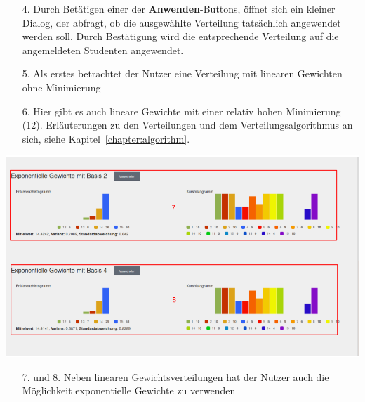   \begin{enumerate}
   \item[4.] Durch Betätigen einer der \textbf{Anwenden}-Buttons, öffnet sich ein kleiner Dialog, der abfragt, ob die ausgewählte Verteilung 
	    tatsächlich angewendet werden soll. Durch Bestätigung wird die entsprechende Verteilung auf die angemeldeten Studenten angewendet.  
   \item[5.] Als erstes betrachtet der Nutzer eine Verteilung mit linearen Gewichten ohne Minimierung
   \item[6.] Hier gibt es auch lineare Gewichte mit einer relativ hohen Minimierung (12). 
	     Erläuterungen zu den Verteilungen und dem Verteilungsalgorithmus an sich, siehe Kapitel~\ref{chapter:algorithm}. 
  \end{enumerate}

  \includegraphics[scale=0.3]{backend/img/distribution_3 .png}
  \begin{enumerate}
   \item[7. und 8.] Neben linearen Gewichtsverteilungen hat der Nutzer auch die Möglichkeit exponentielle Gewichte zu verwenden
  \end{enumerate}

